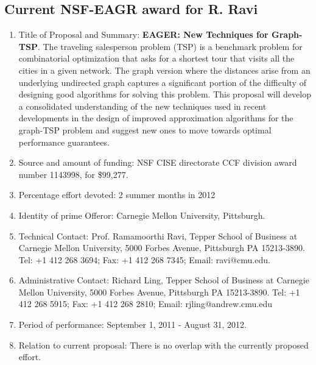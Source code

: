 \subsection{Current NSF-EAGR award for R. Ravi}
\begin{enumerate}
\item Title of Proposal and Summary: {\bf EAGER: New Techniques for Graph-TSP}. The traveling salesperson problem (TSP) is a benchmark problem for combinatorial optimization that asks for a shortest tour that visits all the cities in a given network. The graph version where the distances arise from an underlying undirected graph captures a significant portion of the difficulty of designing good algorithms for solving this problem. This proposal will develop a consolidated understanding of the new techniques used in recent developments in the design of improved approximation algorithms for the graph-TSP problem and suggest new ones to move towards optimal performance guarantees.
\item Source and amount of funding: NSF CISE directorate CCF division award number 1143998, for \$99,277.
\item Percentage effort devoted: 2 summer months in 2012
\item Identity of prime Offeror: Carnegie Mellon University, Pittsburgh.
\item Technical Contact: Prof. Ramamoorthi Ravi,  Tepper School of Business at
 Carnegie Mellon University,  5000 Forbes Avenue, Pittsburgh PA 15213-3890.  Tel: +1 412 268 3694;  Fax: +1 412 268 7345;  Email: ravi@cmu.edu.
\item Administrative Contact: Richard Ling, Tepper School of Business at
 Carnegie Mellon University,  5000 Forbes Avenue, Pittsburgh PA 15213-3890. Tel: +1 412 268 5915; Fax: +1 412 268 2810; Email: rjling@andrew.cmu.edu
\item  Period of performance: September 1, 2011 - August 31, 2012.
\item Relation to current proposal: There is no overlap with the currently proposed effort.
\end{enumerate}

